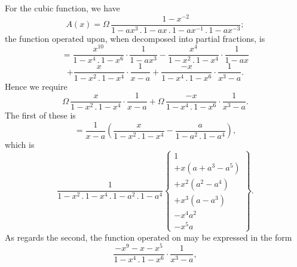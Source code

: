 \documentclass[11pt,a4paper]{article}
\begin{document}
For the cubic function, we have
\[
A(x) = \Omega\,\frac{1 - x^{-2}}{1 - a x^{3}\,.\,1 - a x\,.\,1 - a x^{-1}\,.\,1 - a x^{-3}};
\]
the function operated upon, when decomposed into partial fractions, is
\[
= \frac{x^{10}}{1 - x^{4}\,.\,1 - x^{6}}\cdot\frac{1}{1 - a x^{3}} - \frac{x^{4}}{1 - x^{2}\,.\,1 - x^{4}}\cdot\frac{1}{1 - a x}
\]
\[
+ \frac{x}{1 - x^{2}\,.\,1 - x^{4}}\cdot\frac{1}{x - a} + \frac{-x}{1 - x^{4}\,.\,1 - x^{6}}\cdot\frac{1}{x^{3} - a}.
\]
Hence we require
\[
\Omega\,\frac{x}{1 - x^{2}\,.\,1 - x^{4}}\cdot\frac{1}{x - a} + \Omega\,\frac{-x}{1 - x^{4}\,.\,1 - x^{6}}\cdot\frac{1}{x^{3} - a}.
\]
The first of these is
\[
= \frac{1}{x - a}\left( \frac{x}{1 - x^{2}\,.\,1 - x^{4}} - \frac{a}{1 - a^{2}\,.\,1 - a^{4}} \right),
\]
which is
\[
\frac{1}{1 - x^{2}\,.\,1 - x^{4}\,.\,1 - a^{2}\,.\,1 - a^{4}}\left\{
\begin{array}{l}
1 \\
+ x(a + a^{3} - a^{5}) \\
+ x^{2}(a^{2} - a^{4}) \\
+ x^{3}(a - a^{3}) \\
- x^{4} a^{2} \\
- x^{5} a
\end{array}
\right\}.
\]
As regards the second, the function operated on may be expressed in the form
\[
\frac{-x^{9} - x - x^{5}}{1 - x^{4}\,.\,1 - x^{6}}\cdot\frac{1}{x^{3} - a},
\]
\end{document}
